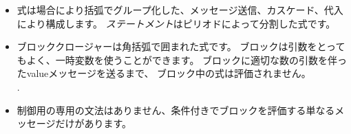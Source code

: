 \documentclass[a4paper,10pt,twoside]{book}
\begin{document}
\begin{itemize}
\item	式は場合により括弧でグループ化した、メッセージ送信、カスケード、代入により構成します。
		\emph{ステートメント}はピリオドによって分割した式です。

\item	ブロッククロージャーは角括弧で囲まれた式です。
		ブロックは引数をとってもよく、一時変数を使うことができます。
		ブロックに適切な数の引数を伴ったvalueメッセージを送るまで、
		ブロック中の式は評価されません。\\
		.

\item	制御用の専用の文法はありません、条件付きでブロックを評価する単なるメッセージだけがあります。

\end{itemize}

\ifx\wholebook\relax\else
\end{document}
